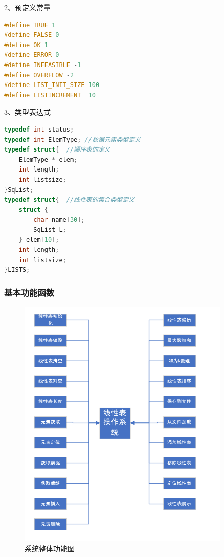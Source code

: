 \documentclass[supercite]{Experimental_Report}
\theoremstyle{definition}
\begin{document}
2、预定义常量

\begin{lstlisting}[language=c]
#define TRUE 1
#define FALSE 0
#define OK 1
#define ERROR 0
#define INFEASIBLE -1
#define OVERFLOW -2
#define LIST_INIT_SIZE 100
#define LISTINCREMENT  10
\end{lstlisting}

3、类型表达式

\begin{lstlisting}[language=c]
typedef int status;
typedef int ElemType; //数据元素类型定义
typedef struct{  //顺序表的定义
    ElemType * elem;
    int length;
    int listsize;
}SqList;
typedef struct{  //线性表的集合类型定义
    struct { 
        char name[30];
        SqList L;
    } elem[10];
    int length;
    int listsize;
}LISTS;
\end{lstlisting}

\subsubsection{基本功能函数}

 \begin{figure}[H]
 	\centering
 	\includegraphics[width=0.9\textwidth]{images/系统概图.png}
 	\caption{系统整体功能图}
 	\label{txlab}
 \end{figure}
\end{document}

